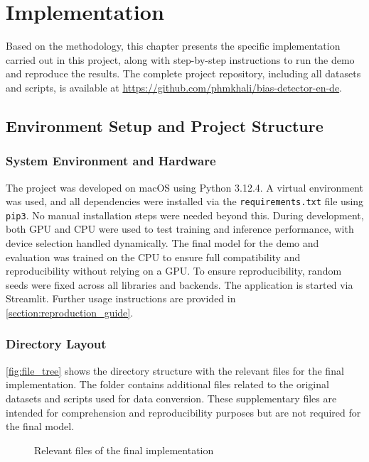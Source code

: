 \chapter{Implementation}
Based on the methodology, this chapter presents the specific implementation carried out in this project, along with step-by-step instructions to run the demo and reproduce the results. The complete project repository, including all datasets and scripts, is available at \url{https://github.com/phmkhali/bias-detector-en-de}.

\section{Environment Setup and Project Structure}
    \subsection{System Environment and Hardware}
    The project was developed on macOS using Python 3.12.4. A virtual environment was used, and all dependencies were installed via the \texttt{requirements.txt} file using \texttt{pip3}. No manual installation steps were needed beyond this. During development, both GPU and CPU were used to test training and inference performance, with device selection handled dynamically. The final model for the demo and evaluation was trained on the CPU to ensure full compatibility and reproducibility without relying on a GPU. To ensure reproducibility, random seeds were fixed across all libraries and backends. The application is started via Streamlit. Further usage instructions are provided in \autoref{section:reproduction_guide}.

\subsection{Directory Layout}
    \autoref{fig:file_tree} shows the directory structure with the relevant files for the final implementation. The folder contains additional files related to the original datasets and scripts used for data conversion. These supplementary files are intended for comprehension and reproducibility purposes but are not required for the final model.

    \vspace{0.8em} 
    \begin{figure}[htb]
        \centering
        \scalebox{0.8}{}
        \caption[Relevant files of the final implementation]{Relevant files of the final implementation}
        \label{fig:file_tree}
    \end{figure}
    \vspace{0.8em} 



